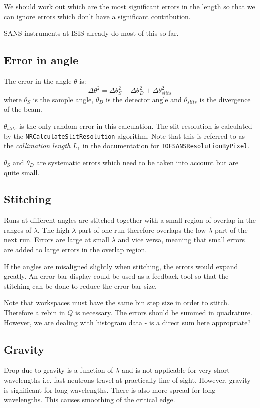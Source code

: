 \documentclass[12pt]{article}
\begin{document}
We should work out which are the most significant errors in the length so that we can ignore errors which don't have a significant contribution.

SANS instruments at ISIS already do most of this so far.

\subsection{Error in angle}
The error in the angle $\theta$ is:
$$\Delta\theta^2 = \Delta\theta_S^2 + \Delta\theta_D^2 + \Delta\theta_{slits}^2$$
where $\theta_S$ is the sample angle, $\theta_D$ is the detector angle and $\theta_{slits}$ is the divergence of the beam.

$\theta_{slits}$ is the only random error in this calculation. The slit resolution is calculated by the \texttt{NRCalculateSlitResolution} algorithm. Note that this is referred to as the \emph{collimation length} $L_1$ in the documentation for \texttt{TOFSANSResolutionByPixel}.

$\theta_S$ and $\theta_D$ are systematic errors which need to be taken into account but are quite small.

\subsection{Stitching}
Runs at different angles are stitched together with a small region of overlap in the ranges of $\lambda$. The high-$\lambda$ part of one run therefore overlaps the low-$\lambda$ part of the next run. Errors are large at small $\lambda$ and vice versa, meaning that small errors are added to large errors in the overlap region.

If the angles are misaligned slightly when stitching, the errors would expand greatly. An error bar display could be used as a feedback tool so that the stitching can be done to reduce the error bar size.

Note that workspaces must have the same bin step size in order to stitch. Therefore a rebin in $Q$ is necessary. The errors should be summed in quadrature. However, we are dealing with histogram data - is a direct sum here appropriate?

\subsection{Gravity}
Drop due to gravity is a function of $\lambda$ and is not applicable for very short wavelengths i.e. fast neutrons travel at practically line of sight. However, gravity is significant for long wavelengths. There is also more spread for long wavelengths. This causes smoothing of the critical edge.
\end{document}
